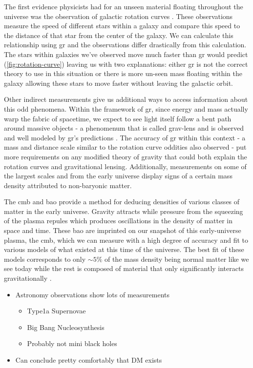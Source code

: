 The first evidence physicists had for an unseen material floating throughout the universe was the
observation of galactic rotation curves \cite{rubin-rotationcurve-1980,rotationcurve-2000}. These
observations measure the speed of different stars within a galaxy and compare this speed to the
distance of that star from the center of the galaxy. We can calculate this relationship using
\gls{gr} \cite{rotationcurve-predictions-2007} and the observations differ drastically from this
calculation. The stars within galaxies we've observed move much faster than \gls{gr} would predict
(\cref{fig:rotation-curve}) leaving us with two explanations: either \gls{gr} is not the correct
theory to use in this situation or there is more un-seen mass floating within the galaxy allowing
these stars to move faster without leaving the galactic orbit.

Other indirect measurements give us additional ways to access information about this odd phenomena.
Within the framework of \gls{gr}, since energy and mass actually warp the fabric of spacetime, we
expect to see light itself follow a bent path around massive objects - a phenomenum that is called
\gls{grav-lens} and is observed and well modeled by \gls{gr}'s predictions \cite{gravlensing-2004}.
The accuracy of \gls{gr} within this context - a mass and distance scale similar to the rotation
curve oddities also observed - put more requirements on any modified theory of gravity that could
both explain the rotation curves and gravitational lensing. Additionally, measurements on some of
the largest scales and from the early universe display signs of a certain mass density attributed
to non-baryonic matter. 

The \gls{cmb} and \gls{bao} provide a method for deducing densities of various classes of matter in
the early universe. Gravity attracts while pressure from the squeezing of the plasma repules which
produces oscillations in the density of matter in space and time. These \gls{bao} are imprinted on
our snapshot of this early-universe plasma, the \gls{cmb}, which we can measure with a high degree
of accuracy and fit to various models of what existed at this time of the universe. The best fit of
these models corresponds to only $\sim 5\%$ of the mass density being normal matter like we see
today while the rest is composed of material that only significantly interacts gravitationally
\cite{planck-cmb-2015}.

\begin{itemize}
  \item Astronomy observations show lots of measurements
        \begin{itemize}
          \item Type1a Supernovae \cite{type1a-supernova-2010}
          \item Big Bang Nucleosynthesis \cite{nucleosynthesis-1998}
          \item Probably not mini black holes \cite{constraints-primordial-black-holes-2021}
        \end{itemize}
  \item Can conclude pretty comfortably that DM exists
\end{itemize}

